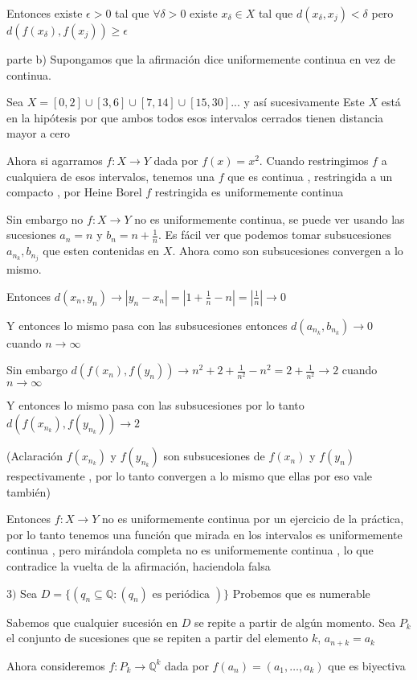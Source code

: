 \documentclass[12pt]{article}
\newcommand{\Q}{\mathbb{Q}}
\newcommand{\ra}{\rightarrow}
\theoremstyle{definition}
\begin{document}
Entonces existe $\epsilon >0$ tal que $\forall \delta >0$ existe $x_{\delta} \in X$ tal que $d(x_{\delta},x_j) < \delta$ pero  $d(f(x_{\delta}),f(x_j)) \geq \epsilon$

parte b) Supongamos que la afirmación dice uniformemente continua en vez de continua.

Sea $X = [0,2] \cup [3,6] \cup [7,14] \cup [15 , 30] ...$ y así sucesivamente  Este $X$ está en la hipótesis por que ambos todos esos intervalos cerrados tienen distancia mayor a cero

Ahora si agarramos $f: X \ra Y$ dada por $f(x) = x^2$. Cuando restringimos $f$ a cualquiera de esos intervalos, tenemos una $f$ que es continua , restringida a un compacto , por Heine Borel $f$ restringida es uniformemente continua

Sin embargo no $f : X \ra Y$ no es uniformemente continua, se puede ver usando las sucesiones $a_n = n$ y $b_n = n + \frac{1}{n}$. Es fácil ver que podemos tomar subsucesiones $a_{n_k},b_{n_j}$ que esten contenidas en $X$. Ahora como son subsucesiones convergen a lo mismo. 

Entonces $d(x_n,y_n) \ra |y_n - x_n| =  |1 + \frac{1}{n} - n |=  |\frac{1}{n}| \ra 0$

Y entonces lo mismo pasa con las subsucesiones entonces $d(a_{n_k},b_{n_k}) \ra 0$ cuando $n \ra \infty$

Sin embargo $d(f(x_n),f(y_n)) \ra n^2 + 2+\frac{1}{n^2} - n^2 = 2 + \frac{1}{n^2} \ra 2 $ cuando $n \ra \infty$

Y entonces lo mismo pasa con las subsucesiones por lo tanto $d(f(x_{n_k}),f(y_{n_k})) \ra 2$

(Aclaración $f(x_{n_k})$ y $f(y_{n_k})$ son subsucesiones de $f(x_n)$ y $f(y_n)$ respectivamente , por lo tanto convergen a lo mismo que ellas por eso vale también) 

Entonces $f: X \ra Y$ no es uniformemente continua por un ejercicio de la práctica, por lo tanto tenemos una función que mirada en los intervalos es uniformemente continua , pero mirándola completa no es uniformemente continua , lo que contradice la vuelta de la afirmación, haciendola falsa 


$3)$ Sea $D = \{(q_n \subseteq \Q : (q_n) \text{ es periódica })\}$ Probemos que es numerable

Sabemos que cualquier sucesión en $D$ se repite a partir de algún momento. Sea $P_k$ el conjunto de sucesiones que se repiten a partir del elemento $k$, $a_{n +k} = a_k$

Ahora consideremos $f: P_k \ra \Q^k$ dada por $f(a_n) = (a_1, \dots ,a_k)$ que es biyectiva
\end{document}
